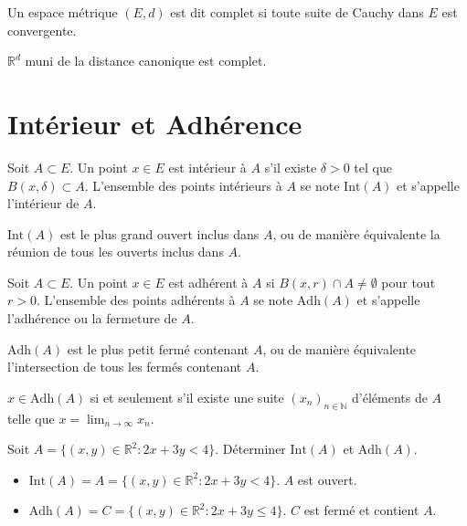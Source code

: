 \documentclass[oneside]{book}
\begin{document}
\begin{definition}
Un espace métrique $(E, d)$ est dit complet si toute suite de Cauchy dans $E$ est convergente.
\end{definition}

\begin{theorem}
$\mathbb{R}^d$ muni de la distance canonique est complet.
\end{theorem}

\section{Intérieur et Adhérence}

\begin{definition}[Intérieur]
Soit $A \subset E$. Un point $x \in E$ est intérieur à $A$ s'il existe $\delta > 0$ tel que $B(x, \delta) \subset A$. L'ensemble des points intérieurs à $A$ se note $\mathrm{Int}(A)$ et s'appelle l'intérieur de $A$.
\end{definition}

\begin{proposition}
$\mathrm{Int}(A)$ est le plus grand ouvert inclus dans $A$, ou de manière équivalente la réunion de tous les ouverts inclus dans $A$.
\end{proposition}

\begin{definition}[Adhérence]
Soit $A \subset E$. Un point $x \in E$ est adhérent à $A$ si $B(x, r) \cap A \neq \emptyset$ pour tout $r > 0$. L'ensemble des points adhérents à $A$ se note $\mathrm{Adh}(A)$ et s'appelle l'adhérence ou la fermeture de $A$.
\end{definition}

\begin{proposition}
$\mathrm{Adh}(A)$ est le plus petit fermé contenant $A$, ou de manière équivalente l'intersection de tous les fermés contenant $A$.
\end{proposition}

\begin{proposition}
$x \in \mathrm{Adh}(A)$ si et seulement s'il existe une suite $(x_n)_{n \in \mathbb{N}}$ d'éléments de $A$ telle que $x = \lim_{n \to \infty} x_n$.
\end{proposition}

\begin{example}
Soit $A = \{(x,y) \in \mathbb{R}^2 : 2x+3y < 4\}$. Déterminer $\mathrm{Int}(A)$ et $\mathrm{Adh}(A)$.
\begin{itemize}
    \item $\mathrm{Int}(A) = A = \{(x,y) \in \mathbb{R}^2 : 2x+3y < 4\}$. $A$ est ouvert.
    \item $\mathrm{Adh}(A) = C = \{(x,y) \in \mathbb{R}^2 : 2x+3y \leq 4\}$. $C$ est fermé et contient $A$.
\end{itemize}
\end{example}
\end{document}
